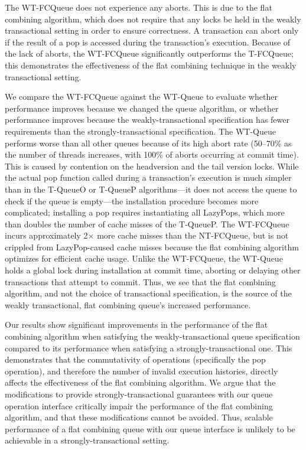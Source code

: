 The WT-FCQueue does not experience any aborts. This is due to the flat combining algorithm, which does not require that any locks be held in the weakly transactional setting in order to ensure correctness. A transaction can abort only if the result of a pop is accessed during the transaction's execution.
Because of the lack of aborts, the WT-FCQueue significantly outperforms the T-FCQueue; this demonstrates the effectiveness of the flat combining technique in the weakly transactional setting. 

We compare the WT-FCQueue against the WT-Queue to evaluate whether performance improves because we changed the queue algorithm, or whether performance improves because the weakly-transactional specification has fewer requirements than the strongly-transactional specification. The WT-Queue performs worse than all other queues because of its high abort rate (50--70\% as the number of threads increases, with 100\% of aborts occurring at commit time). This is caused by contention on the headversion and the tail version locks. While the actual pop function called during a transaction's execution is much simpler than in the T-QueueO or T-QueueP algorithms---it does not access the queue to check if the queue is empty---the installation procedure becomes more complicated; installing a pop requires instantiating all LazyPops, which more than doubles the number of cache misses of the T-QueueP. The WT-FCQueue incurs approximately 2$\times$ more cache misses than the NT-FCQueue, but is not crippled from LazyPop-caused cache misses because the flat combining algorithm optimizes for efficient cache usage. Unlike the WT-FCQueue, the WT-Queue holds a global lock during installation at commit time, aborting or delaying other transactions that attempt to commit. Thus, we see that the flat combining algorithm, and not the choice of transactional specification, is the source of the weakly transactional, flat combining queue's increased performance.

Our results show significant improvements in the performance of the flat combining algorithm when satisfying the weakly-transactional queue specification compared to its performance when satisfying a strongly-transactional one. This demonstrates that the commutativity of operations (specifically the pop operation), and therefore the number of invalid execution histories, directly affects the effectiveness of the flat combining algorithm. We argue that the modifications to provide strongly-transactional guarantees with our queue operation interface critically impair the performance of the flat combining algorithm, and that these modifications cannot be avoided. Thus, scalable performance of a flat combining queue with our queue interface is unlikely to be achievable in a strongly-transactional setting.
